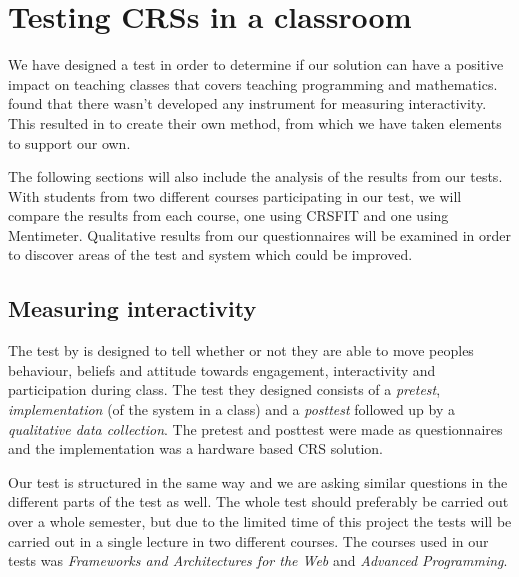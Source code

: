 \section{Testing CRSs in a classroom}\label{sec:testingcrs}
We have designed a test in order to determine if our solution can have a positive impact on teaching classes that covers teaching programming and mathematics.  found that there wasn't developed any instrument for measuring interactivity. This resulted in  to create their own method, from which we have taken elements to support our own.

The following sections will also include the analysis of the results from our tests. With students from two different courses participating in our test, we will compare the results from each course, one using CRSFIT and one using Mentimeter. Qualitative results from our questionnaires will be examined in order to discover areas of the test and system which could be improved.




\subsection{Measuring interactivity}
The test by  is designed to tell whether or not they are able to move peoples behaviour, beliefs and attitude towards engagement, interactivity and participation during class. The test they designed consists of a \emph{pretest}, \emph{implementation} (of the system in a class) and a \emph{posttest} followed up by a \emph{qualitative data collection}. The pretest and posttest were made as questionnaires and the implementation was a hardware based CRS solution.

Our test is structured in the same way and we are asking similar questions in the different parts of the test as well. The whole test should preferably be carried out over a whole semester, but due to the limited time of this project the tests will be carried out in a single lecture in two different courses. The courses used in our tests was \emph{Frameworks and Architectures for the Web} and \emph{Advanced Programming}.

